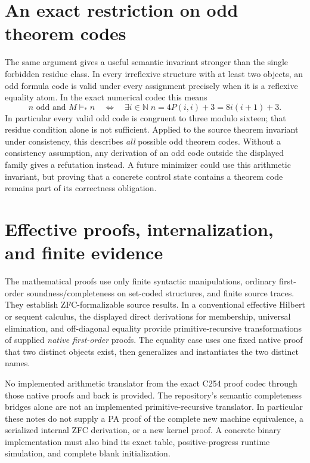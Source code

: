 \documentclass[11pt]{article}
\begin{document}
\section{An exact restriction on odd theorem codes}

The same argument gives a useful semantic invariant stronger than the single
forbidden residue class. In every irreflexive structure with at least two
objects, an odd formula code is valid under every assignment precisely when
it is a reflexive equality atom. In the exact numerical codec this means
\[
 n\text{ odd and }M\models_* n
 \quad\Longleftrightarrow\quad
 \exists i\in\mathbb N\;n=4P(i,i)+3=8i(i+1)+3.
\]
In particular every valid odd code is congruent to three modulo sixteen;
that residue condition alone is not sufficient. Applied to the source theorem
invariant under consistency, this describes \emph{all} possible odd theorem
codes. Without a consistency assumption, any derivation of an odd code outside
the displayed family gives a refutation instead. A future minimizer could use
this arithmetic invariant, but proving that a concrete control state contains
a theorem code remains part of its correctness obligation.

\section{Effective proofs, internalization, and finite evidence}

The mathematical proofs use only finite syntactic manipulations, ordinary
first-order soundness/completeness on set-coded structures, and finite source
traces. They establish ZFC-formalizable source results. In a conventional
effective Hilbert or sequent calculus, the displayed direct derivations for
membership, universal elimination, and off-diagonal equality provide
primitive-recursive transformations of supplied \emph{native first-order}
proofs. The equality case uses one fixed native proof that two distinct objects
exist, then generalizes and instantiates the two distinct names.

No implemented arithmetic translator from the exact C254 proof codec through
those native proofs and back is provided. The repository's semantic
completeness bridges alone are not an implemented primitive-recursive
translator. In particular these notes do not supply a PA proof of the complete
new machine equivalence, a serialized internal ZFC derivation, or a new kernel
proof. A concrete binary implementation must also bind its exact table,
positive-progress runtime simulation, and complete blank initialization.
\end{document}
